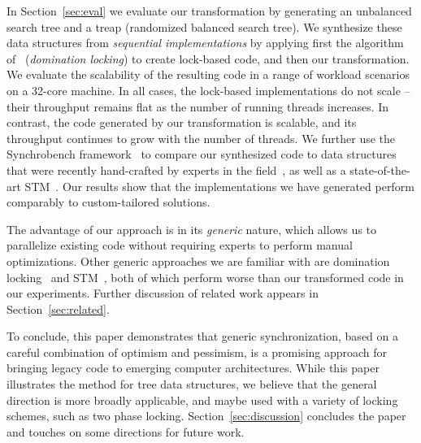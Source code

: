 In Section~\ref{sec:eval} we evaluate our transformation by generating an unbalanced search tree and a treap
(randomized balanced search tree).
We synthesize these data structures from \emph{sequential implementations} by applying first the algorithm of~\cite{Gueta2011} (\emph{domination locking}) to create lock-based code, and then our transformation.
We evaluate the scalability of the resulting code
in a range of workload scenarios on a $32$-core machine.
In all cases, the lock-based implementations do not scale --
their throughput remains flat as the number of running threads increases. In contrast, the code generated by our transformation
is scalable, and its throughput continues to grow with the number of threads.
%
We further use the Synchrobench framework~\cite{Gramoli2015} to 
compare our synthesized code to data structures that were recently hand-crafted by experts in the field~\cite{DrachslerVY2014,BronsonCCO2010,ConcurrentSkipList,EllenFRB2010,CrainGR2013}, 
as well as a state-of-the-art STM~\cite{DBLP:conf/eurosys/ShalevS06}.
Our results show that the implementations we have generated
perform comparably to custom-tailored solutions.

%
The advantage of our approach is in its \emph{generic} nature, which allows us to parallelize existing code without requiring experts to perform
manual optimizations.
Other generic approaches we are familiar with are domination locking~\cite{Gueta2011} and STM~\cite{DBLP:conf/eurosys/ShalevS06}, both of which perform worse than our transformed code in our experiments. 
%
Further discussion of related work appears in Section~\ref{sec:related}.

To conclude, this paper demonstrates that generic synchronization, based on a careful combination of optimism and
pessimism, is a promising approach for bringing legacy code to emerging computer architectures.
While this paper illustrates the method for tree data structures, we believe that the general direction is more broadly applicable, and maybe used with a variety of locking schemes, such as two phase locking.
Section~\ref{sec:discussion} concludes the paper and touches on some directions for future work. 